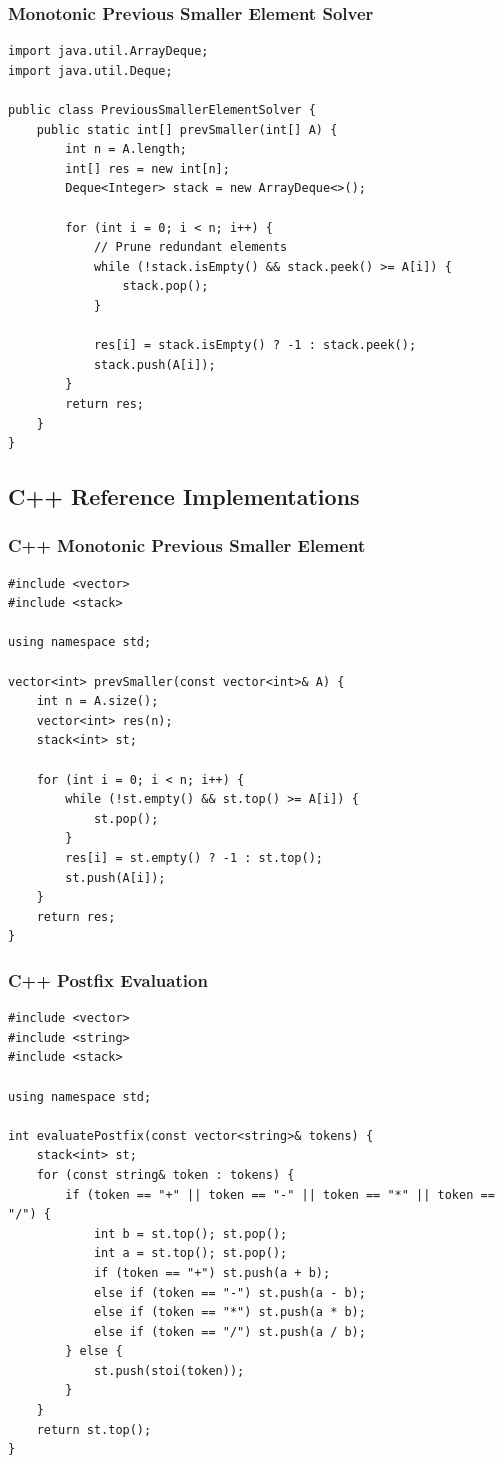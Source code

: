 \documentclass[10pt,journal,compsoc,onecolumn]{IEEEtran}
\begin{document}
\subsubsection{Monotonic Previous Smaller Element Solver}
{\footnotesize
\begin{verbatim}
import java.util.ArrayDeque;
import java.util.Deque;

public class PreviousSmallerElementSolver {
    public static int[] prevSmaller(int[] A) {
        int n = A.length;
        int[] res = new int[n];
        Deque<Integer> stack = new ArrayDeque<>();

        for (int i = 0; i < n; i++) {
            // Prune redundant elements
            while (!stack.isEmpty() && stack.peek() >= A[i]) {
                stack.pop();
            }

            res[i] = stack.isEmpty() ? -1 : stack.peek();
            stack.push(A[i]);
        }
        return res;
    }
}
\end{verbatim}
}

\subsection{C++ Reference Implementations}

\subsubsection{C++ Monotonic Previous Smaller Element}
{\footnotesize
\begin{verbatim}
#include <vector>
#include <stack>

using namespace std;

vector<int> prevSmaller(const vector<int>& A) {
    int n = A.size();
    vector<int> res(n);
    stack<int> st;

    for (int i = 0; i < n; i++) {
        while (!st.empty() && st.top() >= A[i]) {
            st.pop();
        }
        res[i] = st.empty() ? -1 : st.top();
        st.push(A[i]);
    }
    return res;
}
\end{verbatim}
}

\subsubsection{C++ Postfix Evaluation}
{\footnotesize
\begin{verbatim}
#include <vector>
#include <string>
#include <stack>

using namespace std;

int evaluatePostfix(const vector<string>& tokens) {
    stack<int> st;
    for (const string& token : tokens) {
        if (token == "+" || token == "-" || token == "*" || token == "/") {
            int b = st.top(); st.pop();
            int a = st.top(); st.pop();
            if (token == "+") st.push(a + b);
            else if (token == "-") st.push(a - b);
            else if (token == "*") st.push(a * b);
            else if (token == "/") st.push(a / b);
        } else {
            st.push(stoi(token));
        }
    }
    return st.top();
}
\end{verbatim}
}
\end{document}
